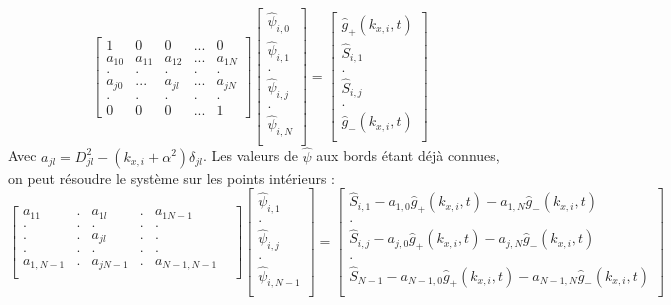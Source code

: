 \begin{equation}
	\begin{bmatrix}
		1 & 0 & 0 &...&0\\
		a_{10} & a_{11} & a_{12} &... &a_{1N}\\
		.&.&.&.&.\\
		a_{j0}& ...&a_{jl}&...&a_{jN}\\
		.&.&.&.&.\\
		0&0&0&...& 1
	\end{bmatrix}
	\begin{bmatrix}
	\widehat{\psi}_{i,0}\\
	\widehat{\psi}_{i,1}\\
	.\\
	\widehat{\psi}_{i,j}\\
	.\\
	\widehat{\psi}_{i,N}\\
	\end{bmatrix}
	=\begin{bmatrix}
		\widehat{g}_+(k_{x,i}, t)\\
		\widehat{S}_{i,1}\\
		.\\
		\widehat{S}_{i,j}\\
		.\\
		\widehat{g}_-(k_{x,i}, t)\\
	\end{bmatrix}
\end{equation}
Avec $a_{jl} = D^2_{jl}-(k_{x,i}+\alpha^2)\delta_{jl}$. Les valeurs de $\widehat{\psi}$ aux bords étant déjà connues, on peut résoudre le système sur les points intérieurs : 
\begin{equation}
	\begin{bmatrix}
         a_{11} &. &a_{1l} &.&a_{1N-1}\\
		.&.&.&.&.\\
		. & . & a_{jl}& .& .&\\
		.&.&.&.&.\\
		a_{1,N-1}& .&a_{jN-1}&.&a_{N-1,N-1}\\
	\end{bmatrix}
	\begin{bmatrix}

		\widehat{\psi}_{i,1}\\
		.\\
		\widehat{\psi}_{i,j}\\
		.\\
		\widehat{\psi}_{i,N-1}\\
	\end{bmatrix}
	=\begin{bmatrix}
		\widehat{S}_{i,1}-a_{1,0}\widehat{g}_+(k_{x,i}, t)- a_{1,N}\widehat{g}_-(k_{x,i}, t)\\
		.\\
		\widehat{S}_{i,j}-a_{j,0}\widehat{g}_+(k_{x,i}, t)- a_{j,N}\widehat{g}_-(k_{x,i}, t)\\
		.\\
		\widehat{S}_{N-1}-a_{N-1,0}\widehat{g}_+(k_{x,i}, t)- a_{N-1,N}\widehat{g}_-(k_{x,i}, t)\\
	\end{bmatrix}
	\label{eq:Helmh_sys}
\end{equation}
